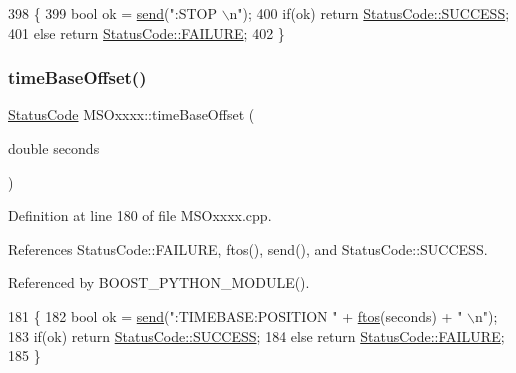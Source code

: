 \begin{DoxyCode}
398 \{
399     \textcolor{keywordtype}{bool} ok = \hyperlink{classMSOxxxx_ae77668a1ae4ccb74e0ed5f2485dfdebf}{send}(\textcolor{stringliteral}{":STOP \(\backslash\)n"});
400     \textcolor{keywordflow}{if}(ok)  \textcolor{keywordflow}{return} \hyperlink{classStatusCode_a6f565cbeadc76d14c72f047e5e85eb4badd0da38d3ba0d922efd1f4619bc37ad8}{StatusCode::SUCCESS};
401     \textcolor{keywordflow}{else}        \textcolor{keywordflow}{return} \hyperlink{classStatusCode_a6f565cbeadc76d14c72f047e5e85eb4ba3da73d4c469762eb9d3c960368252b26}{StatusCode::FAILURE};
402 \}
\end{DoxyCode}
\mbox{\label{classMSOxxxx_ac23ca74ef0e746fe1830bcf26952c42d}} 
\subsubsection{\texorpdfstring{time\+Base\+Offset()}{timeBaseOffset()}}
{\footnotesize\ttfamily \hyperlink{classStatusCode}{Status\+Code} M\+S\+Oxxxx\+::time\+Base\+Offset (\begin{DoxyParamCaption}\item[{double}]{seconds }\end{DoxyParamCaption})}



Definition at line 180 of file M\+S\+Oxxxx.\+cpp.



References Status\+Code\+::\+F\+A\+I\+L\+U\+RE, ftos(), send(), and Status\+Code\+::\+S\+U\+C\+C\+E\+SS.



Referenced by B\+O\+O\+S\+T\+\_\+\+P\+Y\+T\+H\+O\+N\+\_\+\+M\+O\+D\+U\+L\+E().


\begin{DoxyCode}
181 \{
182     \textcolor{keywordtype}{bool} ok = \hyperlink{classMSOxxxx_ae77668a1ae4ccb74e0ed5f2485dfdebf}{send}(\textcolor{stringliteral}{":TIMEBASE:POSITION "} + \hyperlink{classMSOxxxx_ab9c897c3dc0a52cbe5a5da67fc520ed7}{ftos}(seconds) + \textcolor{stringliteral}{" \(\backslash\)n"});  
183     \textcolor{keywordflow}{if}(ok)  \textcolor{keywordflow}{return} \hyperlink{classStatusCode_a6f565cbeadc76d14c72f047e5e85eb4badd0da38d3ba0d922efd1f4619bc37ad8}{StatusCode::SUCCESS};
184     \textcolor{keywordflow}{else}        \textcolor{keywordflow}{return} \hyperlink{classStatusCode_a6f565cbeadc76d14c72f047e5e85eb4ba3da73d4c469762eb9d3c960368252b26}{StatusCode::FAILURE};  
185 \}
\end{DoxyCode}
\mbox{\label{classMSOxxxx_a0327f511fdb8920ddabf1dbbd54f9e9f}} 
